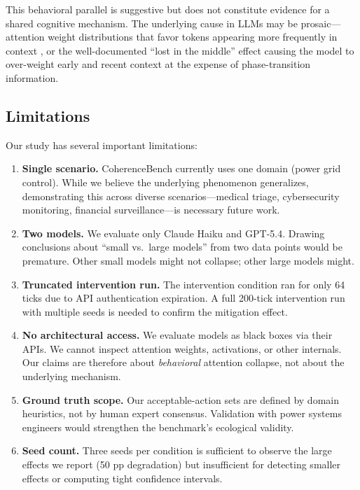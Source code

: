 \documentclass{article}
\begin{document}
This behavioral parallel is suggestive but does not constitute evidence
for a shared cognitive mechanism. The underlying cause in LLMs may be
prosaic---attention weight distributions that favor tokens appearing more
frequently in context \cite{vaswani2017attention}, or the well-documented
``lost in the middle'' effect \cite{liu2024lost} causing the model to
over-weight early and recent context at the expense of phase-transition
information.

\subsection{Limitations}
\label{sec:limitations}

Our study has several important limitations:

\begin{enumerate}
    \item \textbf{Single scenario.} CoherenceBench currently uses one
    domain (power grid control). While we believe the underlying
    phenomenon generalizes, demonstrating this across diverse
    scenarios---medical triage, cybersecurity monitoring, financial
    surveillance---is necessary future work.

    \item \textbf{Two models.} We evaluate only Claude Haiku and
    GPT-5.4. Drawing conclusions about ``small vs.\ large models''
    from two data points would be premature. Other small models might
    not collapse; other large models might.

    \item \textbf{Truncated intervention run.} The intervention
    condition ran for only 64 ticks due to API authentication expiration.
    A full 200-tick intervention run with multiple seeds is needed to
    confirm the mitigation effect.

    \item \textbf{No architectural access.} We evaluate models as black
    boxes via their APIs. We cannot inspect attention weights,
    activations, or other internals. Our claims are therefore about
    \emph{behavioral} attention collapse, not about the underlying
    mechanism.

    \item \textbf{Ground truth scope.} Our acceptable-action sets are
    defined by domain heuristics, not by human expert consensus.
    Validation with power systems engineers would strengthen the
    benchmark's ecological validity.

    \item \textbf{Seed count.} Three seeds per condition is sufficient
    to observe the large effects we report (50 pp degradation) but
    insufficient for detecting smaller effects or computing tight
    confidence intervals.
\end{enumerate}
\end{document}
